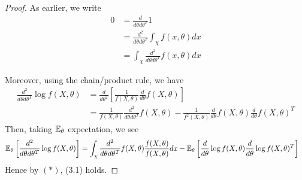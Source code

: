 \documentclass[a4paper]{article}
\begin{document}
\begin{proof}
	As earlier, we write
	\begin{align*}
		0 &= \frac{d}{d \theta d \theta^{T}} 1 \\
		&= \frac{d^2}{d \theta d \theta^{T}} \int_{\chi} f(x, \theta) dx \\
		&= \int_{\chi} \frac{d^2}{d \theta d \theta^{T}} f(x, \theta) dx \tag{*}
	\end{align*}

	Moreover, using the chain/product rule, we have
	\begin{align*}
		\frac{d^2}{d\theta d\theta^{T}}\log f(X, \theta) &= \frac{d}{d \theta^{T}} \left[ \frac{1}{f(X, \theta)} \frac{d}{d\theta} f(X,\theta) \right] \\
		&= \frac{1}{f(X,\theta)} \frac{d^2}{d\theta d\theta^{T}} f(X, \theta) - \frac{1}{f^2(X, \theta)} \frac{d}{d \theta} f(X, \theta) \frac{d}{d \theta} f(X, \theta)^{T}
	\end{align*}
	Then, taking $\mathbb{E}_{\theta}$ expectation, we see
	 \begin{align*}
		 \mathbb{E}_{\theta} \left[ \frac{d^2}{d\theta d\theta^{T}} \log f(X, \theta)\right] &= \int_{\chi} \frac{d^2}{d\theta d\theta^{T}} f(X,\theta) \frac{f(X, \theta)}{f(X,\theta)} dx - \mathbb{E}_{\theta} \left[ \frac{d}{d \theta} \log f(X, \theta) \frac{d}{d \theta} \log f(X, \theta)^{T}  \right] 
	\end{align*}
	Hence by $(*)$, (3.1) holds.
\end{proof}
\end{document}
